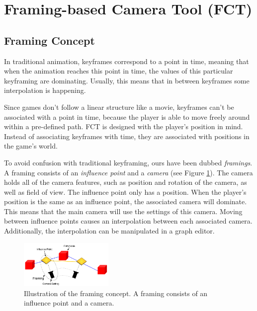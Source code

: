 \section{Framing-based Camera Tool (FCT)}
\subsection{Framing Concept}
In traditional animation, keyframes correspond to a point in time, meaning that when the animation reaches this point in time, the values of this particular keyframing are dominating. Usually, this means that in between keyframes some interpolation is happening. 


Since games don't follow a linear structure like a movie, keyframes can't be associated with a point in time, because the player is able to move freely around within a pre-defined path. FCT is designed with the player's position in mind. Instead of associating keyframes with time, they are associated with positions in the game's world.


To avoid confusion with traditional keyframing, ours have been dubbed \textit{framings}. A framing consists of an \textit{influence point} and a \textit{camera} (see Figure \ref{fig:framingConcept}). The camera holds all of the camera features, such as position and rotation of the camera, as well as field of view. The influence point only has a position. When the player's position is the same as an influence point, the associated camera will dominate. This means that the main camera will use the settings of this camera. Moving between influence points causes an interpolation between each associated camera. Additionally, the interpolation can be manipulated in a graph editor.

\begin{figure}[htbp]
\centering
\includegraphics[width=0.4\textwidth]{Pics/Instructions}
\caption{Illustration of the framing concept. A framing consists of an influence point and a camera.}
\label{fig:framingConcept}
\end{figure}

